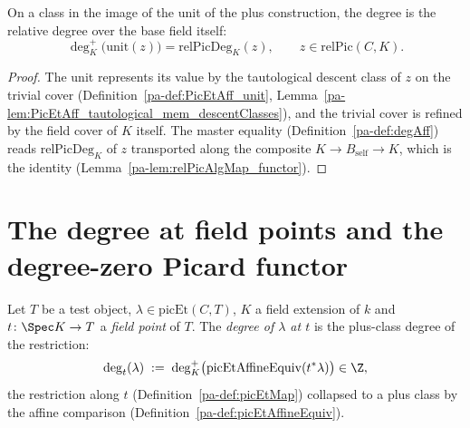 \begin{theorem}
  \label{pa-thm:degAff_unit}
  \leanok

  On a class in the image of the unit of the plus construction, the degree is the relative
  degree over the base field itself:
  \[
    \deg^{+}_K\bigl(\mathrm{unit}(z)\bigr) = \mathrm{relPicDeg}_K(z),
    \qquad z \in \mathrm{relPic}(C,K).
  \]
\end{theorem}
\begin{proof}
  \leanok
  The unit represents its value by the tautological descent class of \(z\) on the trivial
  cover (Definition~\ref{pa-def:PicEtAff_unit},
  Lemma~\ref{pa-lem:PicEtAff_tautological_mem_descentClasses}), and the trivial cover is
  refined by the field cover of \(K\) itself. The master equality
  (Definition~\ref{pa-def:degAff}) reads \(\mathrm{relPicDeg}_K\) of \(z\) transported along the
  composite \(K \to B_{\mathrm{self}} \to K\), which is the identity
  (Lemma~\ref{pa-lem:relPicAlgMap_functor}).
\end{proof}

\section{The degree at field points and the degree-zero Picard functor}
\label{pa-sec:pic0}

\begin{definition}
  \label{pa-def:degAt}
  \leanok

  Let \(T\) be a test object, \(\lambda \in \mathrm{picEt}(C,T)\), \(K\) a field extension of
  \(k\) and \(t \colon \Spec K \to T\) a \emph{field point} of \(T\). The \emph{degree of
  \(\lambda\) at \(t\)} is the plus-class degree of the restriction:
  \[
    \deg_t(\lambda) \;:=\; \deg^{+}_K\bigl(\mathrm{picEtAffineEquiv}(t^{*}\lambda)\bigr) \in \Z ,
  \]
  the restriction along \(t\) (Definition~\ref{pa-def:picEtMap}) collapsed to a plus class by
  the affine comparison (Definition~\ref{pa-def:picEtAffineEquiv}).
\end{definition}

